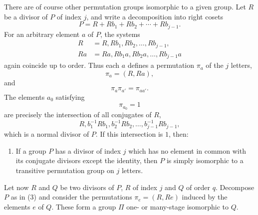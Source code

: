 \documentclass[11pt]{article}
\begin{document}
There are of course other permutation groups isomorphic to a given group. Let $R$ be a divisor of $P$ of index $j$, and write a decomposition into right cosets
\begin{equation}
P=R+Rb_1+Rb_2+\cdots+Rb_{j-1}.
\tag{3}
\end{equation}
For an arbitrary element $a$ of $P$, the systems
\begin{equation}
\begin{aligned}
R&=R,Rb_1,Rb_2,\ldots,Rb_{j-1},\\
Ra&=Ra,Rb_1a,Rb_2a,\ldots,Rb_{j-1}a
\end{aligned}
\tag{4}
\end{equation}
again coincide up to order. Thus each $a$ defines a permutation $\pi_a$ of the $j$ letters,
\begin{equation}
\pi_a=(R,Ra),
\tag{5}
\end{equation}
and
\begin{equation}
\pi_a\pi_{a'}=\pi_{aa'}.
\tag{6}
\end{equation}
The elements $a_0$ satisfying
\begin{equation}
\pi_{a_0}=1
\tag{7}
\end{equation}
are precisely the intersection of all conjugates of $R$,
\[
R,
 b_1^{-1}Rb_1,
 b_2^{-1}Rb_2,
\ldots,b_{j-1}^{-1}Rb_{j-1},
\]
which is a normal divisor of $P$. If this intersection is $1$, then:
\begin{enumerate}[label=\arabic*.,leftmargin=2.2em,start=2]
\item If a group $P$ has a divisor of index $j$ which has no element in common with its conjugate divisors except the identity, then $P$ is simply isomorphic to a transitive permutation group on $j$ letters.
\end{enumerate}

Let now $R$ and $Q$ be two divisors of $P$, $R$ of index $j$ and $Q$ of order $q$. Decompose $P$ as in (3) and consider the permutations $\pi_e=(R,Re)$ induced by the elements $e$ of $Q$. These form a group $\Pi$ one- or many-stage isomorphic to $Q$.
\end{document}
